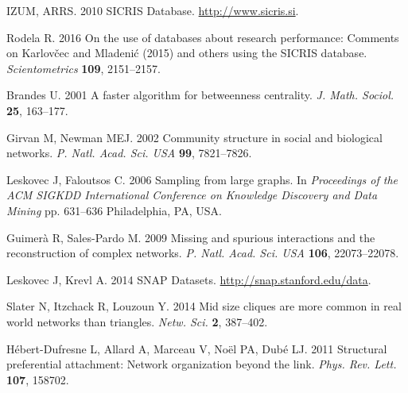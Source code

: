 \documentclass[]{rsif}
\begin{document}
\begin{thebibliography}{99}
IZUM, ARRS. 2010  {SICRIS} {Database}. \url{http://www.sicris.si}.

Rodela R. 2016  On the use of databases about research performance: {Comments}
  on {Karlov{\v c}ec} and {Mladeni{\'c}} (2015) and others using the {SICRIS}
  database. {\em Scientometrics} \textbf{109}, 2151--2157.

Brandes U. 2001  A faster algorithm for betweenness centrality. {\em J. Math.
  Sociol.} \textbf{25}, 163--177.

Girvan M, Newman MEJ. 2002  Community structure in social and biological
  networks. {\em P. Natl. Acad. Sci. USA} \textbf{99}, 7821--7826.

Leskovec J, Faloutsos C. 2006  Sampling from large graphs. In {\em Proceedings
  of the {ACM} {SIGKDD} {International} {Conference} on {Knowledge} {Discovery}
  and {Data} {Mining}} pp. 631--636 Philadelphia, PA, USA.

Guimer{\`a} R, Sales-Pardo M. 2009  Missing and spurious interactions and the
  reconstruction of complex networks. {\em P. Natl. Acad. Sci. USA}
  \textbf{106}, 22073--22078.

Leskovec J, Krevl A. 2014  {SNAP} {Datasets}.
  \url{http://snap.stanford.edu/data}.

Slater N, Itzchack R, Louzoun Y. 2014  Mid size cliques are more common in real
  world networks than triangles. {\em Netw. Sci.} \textbf{2}, 387--402.

H{\'e}bert-Dufresne L, Allard A, Marceau V, No{\"e}l PA, Dub{\'e} LJ. 2011
  Structural preferential attachment: {Network} organization beyond the link.
  {\em Phys. Rev. Lett.} \textbf{107}, 158702.

\end{thebibliography}
\end{document}
